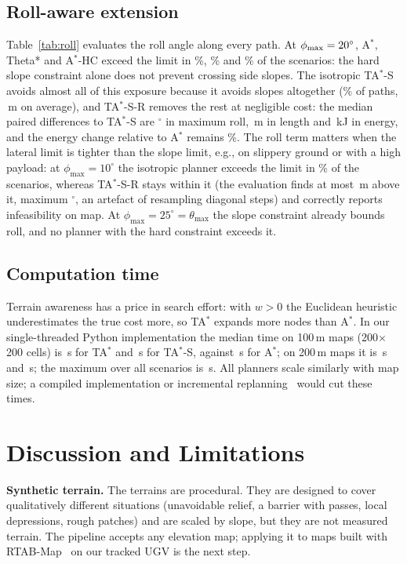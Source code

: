 \documentclass[conference]{IEEEtran}
\newcommand{\TAS}{TA$^*$-S}
\newcommand{\TA}{TA$^*$}
\newcommand{\Astar}{A$^*$}
\newcommand{\HC}{A$^*$-HC}
\newcommand{\thmax}{\theta_{\max}}
\begin{document}


\subsection{Roll-aware extension}
Table~\ref{tab:roll} evaluates the roll angle along every path. At
$\phi_{\max}=20^\circ$, \Astar, Theta* and \HC{} exceed the limit in
\rlAExposedMain\%, \rlThetaExposedMain\% and \rlAHCExposedMain\% of the
scenarios: the hard slope constraint alone does not prevent crossing side
slopes. The isotropic \TAS{} avoids almost all of this
exposure because it avoids slopes altogether (\rlTASExposedMain\% of paths,
\rlTASRollLenMain\,m on average), and \TAS-R removes the rest at negligible
cost: the median paired differences to \TAS{} are \rlTestMaxRollD$^\circ$ in
maximum roll, \rlTestLenD\,m in length and \rlTestEnergyD\,kJ in energy, and
the energy change relative to \Astar{} remains \rlTASRDEMain\%. The roll term
matters when the lateral limit is tighter than the slope limit, e.g., on
slippery ground or with a high payload: at $\phi_{\max}=10^\circ$ the isotropic
planner exceeds the limit in \rlTASExposedTen\% of the scenarios, whereas
\TAS-R stays within it (the evaluation finds at most \rlTASRRollLenMaxTen\,m
above it, maximum \rlTASRMaxRollMaxTen$^\circ$, an artefact of resampling
diagonal steps) and correctly reports infeasibility on \rlTASRFailTen{} map.
At $\phi_{\max}=25^\circ=\thmax$ the slope constraint already bounds roll, and
no planner with the hard constraint exceeds it.

\subsection{Computation time}
Terrain awareness has a price in search effort: with $w>0$ the Euclidean
heuristic underestimates the true cost more, so \TA{} expands more nodes than
\Astar. In our single-threaded Python implementation the median time on
100\,m maps (200$\times$200 cells) is \timeTAOneZeroZero\,s for \TA{} and
\timeTASOneZeroZero\,s for \TAS, against \timeAOneZeroZero\,s for \Astar; on
200\,m maps it is \timeTATwoZeroZero\,s and \timeTASTwoZeroZero\,s; the maximum over all scenarios is \timeMaxTAS\,s. All
planners scale similarly with map size; a compiled implementation or
incremental replanning~\cite{koenig2002dstarlite} would cut these times.

\section{Discussion and Limitations}
\textbf{Synthetic terrain.} The terrains are procedural. They are designed to
cover qualitatively different situations (unavoidable relief, a barrier with
passes, local depressions, rough patches) and are scaled by slope, but they
are not measured terrain. The pipeline accepts any elevation map; applying it
to maps built with RTAB-Map~\cite{labbe2019rtabmap} on our tracked UGV is the
next step.
\end{document}
